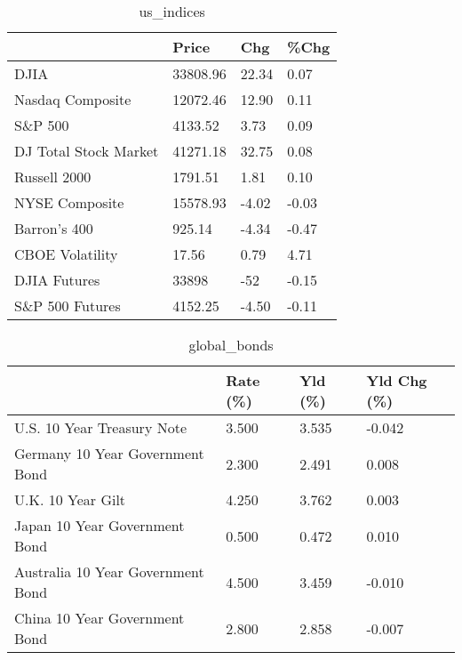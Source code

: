 \documentclass{article}%
\begin{document}
%


\begin{table}[htbp]%
\caption{us\_indices}%
\centering%
\begin{adjustbox}{width=1\textwidth}%
\begin{tabular}{llll}
\toprule
                      &    Price &   Chg &  \%Chg \\
\midrule
                 DJIA & 33808.96 & 22.34 &  0.07 \\
     Nasdaq Composite & 12072.46 & 12.90 &  0.11 \\
              S\&P 500 &  4133.52 &  3.73 &  0.09 \\
DJ Total Stock Market & 41271.18 & 32.75 &  0.08 \\
         Russell 2000 &  1791.51 &  1.81 &  0.10 \\
       NYSE Composite & 15578.93 & -4.02 & -0.03 \\
         Barron's 400 &   925.14 & -4.34 & -0.47 \\
      CBOE Volatility &    17.56 &  0.79 &  4.71 \\
         DJIA Futures &    33898 &   -52 & -0.15 \\
      S\&P 500 Futures &  4152.25 & -4.50 & -0.11 \\
\bottomrule
\end{tabular}
%
\end{adjustbox}%
\end{table}

%


\begin{table}[htbp]%
\caption{global\_bonds}%
\centering%
\begin{adjustbox}{width=1\textwidth}%
\begin{tabular}{llll}
\toprule
                                  & Rate (\%) & Yld (\%) & Yld Chg (\%) \\
\midrule
       U.S. 10 Year Treasury Note &    3.500 &   3.535 &      -0.042 \\
  Germany 10 Year Government Bond &    2.300 &   2.491 &       0.008 \\
                U.K. 10 Year Gilt &    4.250 &   3.762 &       0.003 \\
    Japan 10 Year Government Bond &    0.500 &   0.472 &       0.010 \\
Australia 10 Year Government Bond &    4.500 &   3.459 &      -0.010 \\
    China 10 Year Government Bond &    2.800 &   2.858 &      -0.007 \\
\bottomrule
\end{tabular}
%
\end{adjustbox}%
\end{table}
\end{document}
